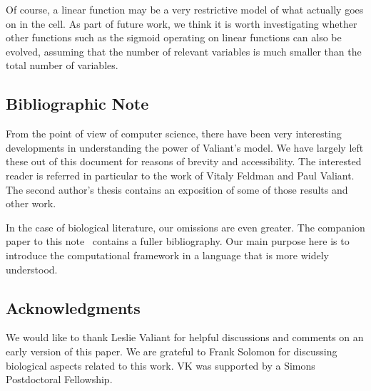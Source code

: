 \documentclass{acmtr2e}
\begin{document}
Of course, a linear function may be a very restrictive model of what actually
goes on in the cell. As part of future work, we think it is worth investigating
whether other functions such as the sigmoid operating on linear functions can also
be evolved, assuming that the number of relevant variables is much smaller than
the total number of variables.

\subsection*{Bibliographic Note}

From the point of view of computer science, there have been very interesting
developments in understanding the power of Valiant's model. We have largely left
these out of this document for reasons of brevity and accessibility. The
interested reader is referred in particular to the work of Vitaly Feldman and
Paul Valiant. The second author's thesis contains an exposition of some of those
results and other work.

In the case of biological literature, our omissions are even greater. The
companion paper to this note~\cite{AK:2013} contains a fuller bibliography. Our
main purpose here is to introduce the computational framework in a language that
is more widely understood.

\subsection*{Acknowledgments} 
We would like to thank Leslie Valiant for helpful discussions and comments on an
early version of this paper. We are grateful to Frank Solomon for discussing
biological aspects related to this work. VK was supported by a Simons
Postdoctoral Fellowship.



\end{document}
